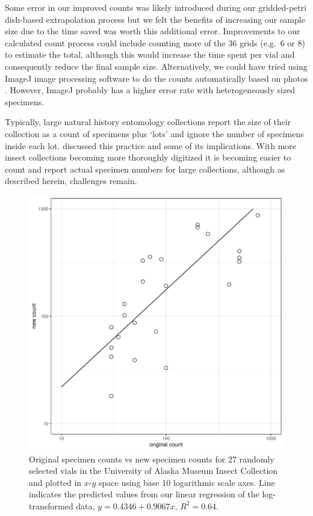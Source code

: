 \begin{multicols}{2}
Some error in our improved counts was likely introduced during our gridded-petri dish-based extrapolation process but we felt the benefits of increasing our sample size due to the time saved was worth this additional error. Improvements to our calculated count process could include counting more of the 36 grids (e.g.\ 6 or 8) to estimate the total, although this would increase the time spent per vial and consequently reduce the final sample size. Alternatively, we could have tried using ImageJ image processing software to do the counts automatically based on photos \citep{Parkeretal2020}. However, ImageJ probably has a higher error rate with heterogeneously sized specimens.

Typically, large natural history entomology collections report the size of their collection as a count of specimens plus ‘lots’ and ignore the number of specimens inside each lot. \citet{Sikes2015} discussed this practice and some of its implications. With more insect collections becoming more thoroughly digitized it is becoming easier to count and report actual specimen numbers for large collections, although as described herein, challenges remain.

\end{multicols}
\begin{figure}[H]
\begin{center}
\includegraphics[width=15cm]{img/specimen_count.pdf}
\caption{Original specimen counts vs new specimen counts for 27 randomly selected vials in the University of Alaska Museum Insect Collection and plotted in $x$-$y$ space using base 10 logarithmic scale axes. Line indicates the predicted values from our linear regression of the log-transformed data, $y = 0.4346 + 0.9067x$, $R^2 = 0.64$.}
\label{specimen_count_graph}
\end{center}
\end{figure} 
